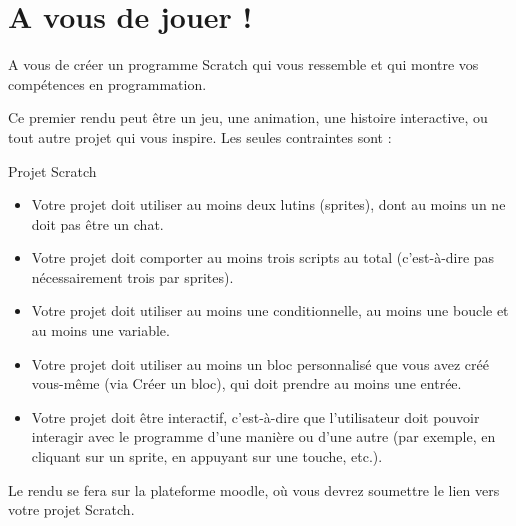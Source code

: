 \section{A vous de jouer !}
A vous de créer un programme Scratch qui vous ressemble et qui montre vos compétences en programmation.

Ce premier rendu peut être un jeu, une animation, une histoire interactive, ou tout autre projet qui vous inspire. Les seules contraintes sont : 
\begin{UPSTIaRendre}{Projet Scratch}    
    \begin{itemize}
    \item Votre projet doit utiliser au moins deux lutins (sprites), dont au moins un ne doit pas être un chat.
    \item Votre projet doit comporter au moins trois scripts au total (c'est-à-dire pas nécessairement trois par sprites).
    \item Votre projet doit utiliser au moins une conditionnelle, au moins une boucle et au moins une variable.
    \item Votre projet doit utiliser au moins un bloc personnalisé que vous avez créé vous-même (via Créer un bloc), qui doit prendre au moins une entrée.
    \item Votre projet doit être interactif, c'est-à-dire que l'utilisateur doit pouvoir interagir avec le programme d'une manière ou d'une autre (par exemple, en cliquant sur un sprite, en appuyant sur une touche, etc.).
    \end{itemize}
\end{UPSTIaRendre}

Le rendu se fera sur la plateforme moodle, où vous devrez soumettre le lien vers votre projet Scratch.  

 


